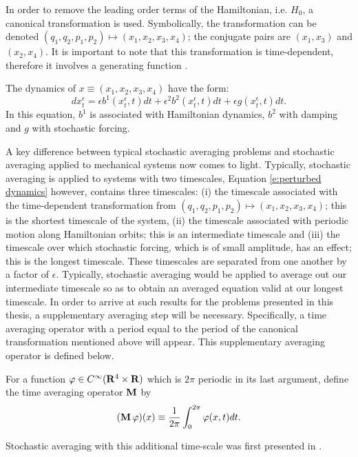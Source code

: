 In order to remove the leading order terms of the Hamiltonian, i.e. $H_0$, a canonical transformation is used. Symbolically, the transformation can be denoted $(q_1,q_2,p_1,p_2) \mapsto (x_1,x_2,x_3,x_4)$; the conjugate pairs are $(x_1,x_3)$ and $(x_2,x_4)$. It is important to note that this transformation is time-dependent, therefore it involves a generating function \citep[\S 9.1]{goldstein80:_class}.

The dynamics of $x \equiv (x_1,x_2,x_3,x_4)$ have the form:
\begin{equation}
\label{e:perturbed dynamics}
dx^\epsilon_t = \epsilon b^1(x^\epsilon_t,t) dt + \epsilon^2 b^2(x^\epsilon_t,t) dt + \epsilon g (x^\epsilon_t, t) dt.
\end{equation}
In this equation, $b^1$ is associated with Hamiltonian dynamics, $b^2$ with damping and $g$ with stochastic forcing.

A key difference between typical stochastic averaging problems and stochastic averaging applied to mechanical systems now comes to light. Typically, stochastic averaging is applied to systems with two timescales, Equation \eqref{e:perturbed dynamics} however, contains three timescales: (i) the timescale associated with the time-dependent transformation from $(q_1,q_2,p_1,p_2) \mapsto (x_1,x_2,x_3,x_4)$; this is the shortest timescale of the system, (ii) the timescale associated with periodic motion along Hamiltonian orbits; this is an intermediate timescale and (iii) the timescale over which stochastic forcing, which is of small amplitude, has an effect; this is the longest timescale. These timescales are separated from one another by a factor of $\epsilon$. Typically, stochastic averaging would be applied to average out our intermediate timescale so as to obtain an averaged equation valid at our longest timescale. In order to arrive at such results for the problems presented in this thesis, a supplementary averaging step will be necessary. Specifically, a time averaging operator with a period equal to the period of the canonical transformation mentioned above will appear. This supplementary averaging operator is defined below.
\begin{definition}
\label{d:Tave}
For a function $\varphi \in C^\infty(\mathbf R^4 \times \mathbf R)$ which is $2\pi$ periodic in its last argument, define the time averaging operator $\operatorname{\mathbf M}$ by
\[
(\operatorname{\mathbf M} \varphi)(x)\equiv \frac{1}{2\pi}\int_0^{2\pi} \varphi(x,t) dt.
\]
\end{definition}
Stochastic averaging with this additional time-scale was first presented in \citet{namachchivaya01:_unified_approac_noisy_nonlin_mathieu_type_system}.

